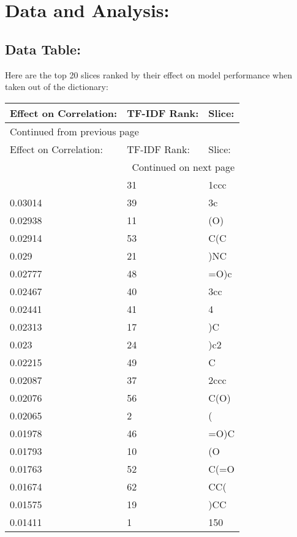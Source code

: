 \documentclass[11pt]{article}
\begin{document}
\section{Data and Analysis:}
\label{sec:org194e138}
\subsection{Data Table:}
\label{sec:org4b93555}
Here are the top 20 slices ranked by their effect on model performance when taken out of the dictionary:
\begin{longtable}{|l|l|l|}
\hline
Effect on Correlation: & TF-IDF Rank: & Slice:\\
\hline
\endfirsthead
\multicolumn{3}{l}{Continued from previous page} \\
\hline

Effect on Correlation: & TF-IDF Rank: & Slice: \\

\hline
\endhead
\hline\multicolumn{3}{r}{Continued on next page} \\
\endfoot
\endlastfoot
\hline
0.04414 & 31 & 1ccc\\
0.03014 & 39 & 3c\\
0.02938 & 11 & (O)\\
0.02914 & 53 & C(C\\
0.029 & 21 & )NC\\
0.02777 & 48 & =O)c\\
0.02467 & 40 & 3cc\\
0.02441 & 41 & 4\\
0.02313 & 17 & )C\\
0.023 & 24 & )c2\\
0.02215 & 49 & C\\
0.02087 & 37 & 2ccc\\
0.02076 & 56 & C(O)\\
0.02065 & 2 & (\\
0.01978 & 46 & =O)C\\
0.01793 & 10 & (O\\
0.01763 & 52 & C(=O\\
0.01674 & 62 & CC(\\
0.01575 & 19 & )CC\\
0.01411 & 1 & 150\\
\hline
\end{longtable}
\end{document}
